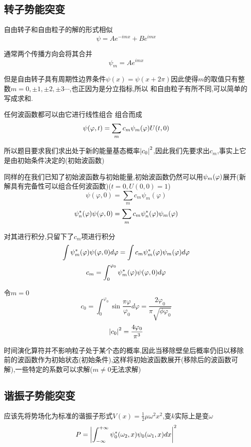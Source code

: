 \documentclass{article}
\begin{document}
        \subsection{转子势能突变}
            自由转子和自由粒子的解的形式相似
            $$ \psi = A e^{-imx} + Be^{imx} $$
            
            通常两个传播方向会将其合并
            $$ \psi_{m} = A e^{imx} $$ 

            但是自由转子具有周期性边界条件$ \psi(x) = \psi(x+2\pi) $因此使得$m$的取值只有整数$ m = 0,\pm{1},\pm{2},\pm{3}\cdots $,也正因为是分立指标,所以
            和自由粒子有所不同,可以简单的写成求和.
            
            任何波函数都可以由它进行线性组合
            组合而成
            $$ \psi(\varphi,t) = \sum_{m} c_{m} \psi_{m} (\varphi) U(t,0 ) $$

            所以题目要求我们求出处于新的能量基态概率$\abs{c_{0}}^{2}$,因此我们先要求出$c_{m}$,事实上它是由初始条件决定的(初始波函数)

            同样的在我们已知了初始波函数与初始能量,初始波函数仍然可以用$\psi_{m} (\varphi)$展开(新解具有完备性可以组合任何波函数)($t=0,U(0,0)=1$)
            $$ \psi(\varphi,0) = \sum_{m} c_{m} \psi_{m}(\varphi) $$
            $$ \psi_{n}^{*} (\varphi) \psi(\varphi,0) = \sum_{m} c_{m} \psi_{n}^{*} (\varphi) \psi_{m} (\varphi) $$

            对其进行积分,只留下了$c_{m}$项进行积分
            $$ \int \psi_{m}^{*} (\varphi) \psi(\varphi,0) d\varphi = \int c_{m} \psi_{m}^{*} (\varphi) \psi_{m} (\varphi) d\varphi $$
            $$ c_{m} =  \int_{0}^{\varphi_0} \psi_{m}^{*} (\varphi) \psi(\varphi,0) d\varphi$$
            
            令$m=0$
            $$ c_{0} = \int_{0}^{\varphi_0} \sin{\frac{\pi \varphi}{\varphi_{0}}} d\varphi  = \frac{2\varphi_{0}}{\pi \sqrt{\phi \varphi_{0}}} $$
            $$ \abs{c_{0}}^{2} = \frac{4 \varphi_{0}}{\pi^{3}}  $$

            时间演化算符并不影响粒子处于某个态的概率,因此当移除壁垒后概率仍旧以移除前的波函数作为初始状态(初始条件),这样将初始波函数展开(移除后的波函数可解),一些特定的系数可以求解($m\neq0$无法求解)

        \subsection{谐振子势能突变}
            应该先将势场化为标准的谐振子形式$ V(x) = \frac{1}{2} \mu \omega ^{2} x^{2} $,变$k$实际上是变$\omega$
            $$ P = \abs{\int_{-\infty}^{+\infty} \psi_{0}^{*} (\omega_{2},x) \psi_{0} (\omega_{1},x) dx }^{2} $$
            
\end{document}
